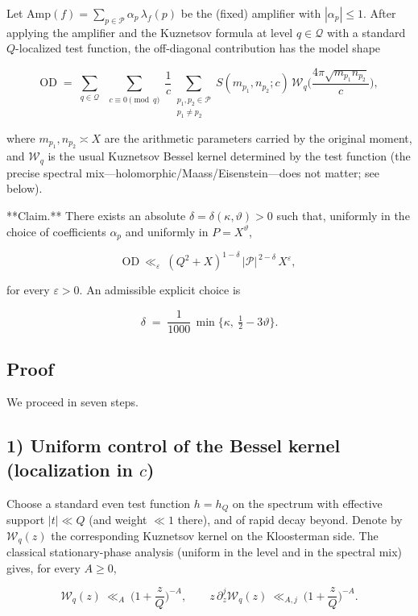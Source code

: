 \documentclass[11pt]{article}
\theoremstyle{definition}
\theoremstyle{remark}
\begin{document}
Let $\mathrm{Amp}(f)=\sum_{p\in\mathcal P}\alpha_p\,\lambda_f(p)$ be the (fixed) amplifier with $|\alpha_p|\le 1$. After applying the amplifier and the Kuznetsov formula at level $q\in\mathcal Q$ with a standard $Q$-localized test function, the off-diagonal contribution has the model shape

$$
\mathrm{OD}\;=\;\sum_{q\in\mathcal Q}\;\sum_{\substack{c\equiv 0\pmod q}}\frac{1}{c}
\sum_{\substack{p_1,p_2\in\mathcal P\\p_1\ne p_2}}
\!S(m_{p_1},n_{p_2};c)\, \mathcal W_q\!\Big(\frac{4\pi\sqrt{m_{p_1}n_{p_2}}}{c}\Big),
$$

where $m_{p_1},n_{p_2}\asymp X$ are the arithmetic parameters carried by the original moment, and $\mathcal W_q$ is the usual Kuznetsov Bessel kernel determined by the test function (the precise spectral mix—holomorphic/Maass/Eisenstein—does not matter; see below).

**Claim.** There exists an absolute $\delta=\delta(\kappa,\vartheta)>0$ such that, uniformly in the choice of coefficients $\alpha_p$ and uniformly in $P=X^\vartheta$,

$$
\boxed{\quad
\mathrm{OD}\ \ll_\varepsilon\ (Q^2+X)^{1-\delta}\,|\mathcal P|^{\,2-\delta}\,X^\varepsilon,
\quad}
$$

for every $\varepsilon>0$. An admissible explicit choice is

$$
\delta\;=\;\frac{1}{1000}\,\min\!\Big\{\kappa,\ \tfrac12-3\vartheta\Big\}.
$$

\subsection*{Proof}

We proceed in seven steps.

\subsection*{1) Uniform control of the Bessel kernel (localization in $c$)}

Choose a standard even test function $h=h_Q$ on the spectrum with effective support $|t|\ll Q$ (and weight $\ll 1$ there), and of rapid decay beyond. Denote by $\mathcal W_q(z)$ the corresponding Kuznetsov kernel on the Kloosterman side. The classical stationary-phase analysis (uniform in the level and in the spectral mix) gives, for every $A\ge 0$,

$$
\mathcal W_q(z)\ \ll_A\ \Big(1+\frac{z}{Q}\Big)^{-A},\qquad
z\,\partial_z^j\mathcal W_q(z)\ \ll_{A,j}\ \Big(1+\frac{z}{Q}\Big)^{-A}.
$$
\end{document}
